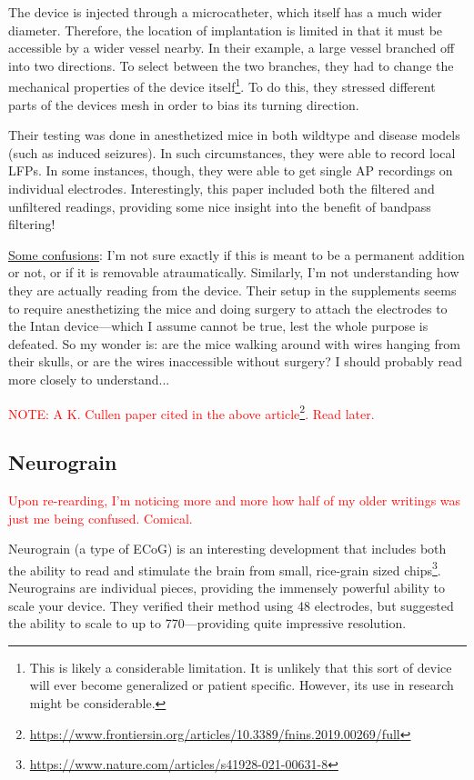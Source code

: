The device is injected through a microcatheter, which itself has a much wider diameter. Therefore, the location of implantation is limited in that it must be accessible by a wider vessel nearby. In their example, a large vessel branched off into two directions. To select between the two branches, they had to change the mechanical properties of the device itself\footnote{This is likely a considerable limitation. It is unlikely that this sort of device will ever become generalized or patient specific. However, its use in research might be considerable.}. To do this, they stressed different parts of the devices mesh in order to bias its turning direction.\newline

Their testing was done in anesthetized mice in both wildtype and disease models (such as induced seizures). In such circumstances, they were able to record local LFPs. In some instances, though, they were able to get single AP recordings on individual electrodes. Interestingly, this paper included both the filtered and unfiltered readings, providing some nice insight into the benefit of bandpass filtering!\newline

\underline{Some confusions}: I'm not sure exactly if this is meant to be a permanent addition or not, or if it is removable atraumatically. Similarly, I'm not understanding how they are actually reading from the device. Their setup in the supplements seems to require anesthetizing the mice and doing surgery to attach the electrodes to the Intan device---which I assume cannot be true, lest the whole purpose is defeated. So my wonder is: are the mice walking around with wires hanging from their skulls, or are the wires inaccessible without surgery? I should probably read more closely to understand...\newline


\textcolor{red}{NOTE: A K. Cullen paper cited in the above article\footnote{\url{https://www.frontiersin.org/articles/10.3389/fnins.2019.00269/full}}. Read later.}

\subsection{Neurograin}

\textcolor{red}{Upon re-rearding, I'm noticing more and more how half of my older writings was just me being confused. Comical.}

Neurograin (a type of ECoG) is an interesting development that includes both the ability to read and stimulate the brain from small, rice-grain sized chips\footnote{\url{https://www.nature.com/articles/s41928-021-00631-8}}. Neurograins are individual pieces, providing the immensely powerful ability to scale your device. They verified their method using 48 electrodes, but suggested the ability to scale to up to 770---providing quite impressive resolution.\newline


